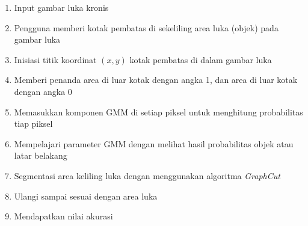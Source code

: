 \begin{enumerate}
    \item{Input gambar luka kronis}
    \item{Pengguna memberi kotak pembatas di sekeliling area luka (objek) pada gambar luka}
    \item{Inisiasi titik koordinat \((x,y)\) kotak pembatas di dalam gambar luka}
    \item{Memberi penanda area di luar kotak dengan angka 1, dan area di luar kotak
    dengan angka 0}
    \item{Memasukkan komponen GMM di setiap piksel untuk menghitung probabilitas 
    tiap piksel }
    \item{Mempelajari parameter GMM dengan melihat hasil probabilitas objek atau latar belakang}
    \item{Segmentasi area keliling luka dengan menggunakan algoritma \emph{GraphCut}}
    \item{Ulangi sampai sesuai dengan area luka}
    \item{Mendapatkan nilai akurasi}
  \end{enumerate}